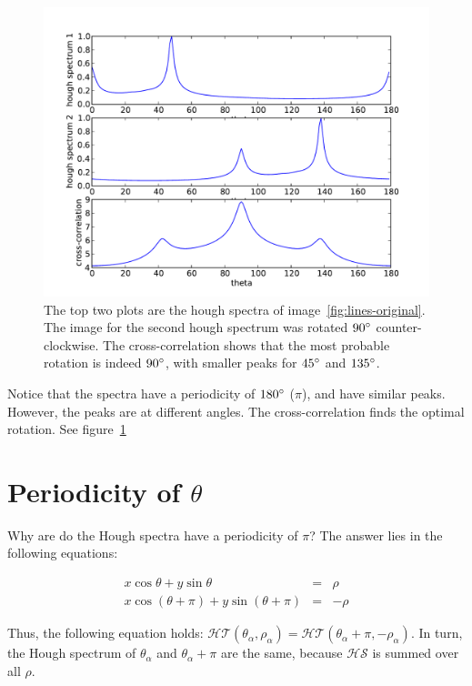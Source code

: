 \begin{figure}[ht]
	\centering
	\includegraphics[width=\textwidth]{images/stitching/lines-cross-correlation.pdf}
	\caption{The top two plots are the hough spectra of image~\ref{fig:lines-original}. The image for the second hough spectrum was rotated $90\degree$ counter-clockwise. The cross-correlation shows that the most probable rotation is indeed $90\degree$, with smaller peaks for $45\degree$ and $135\degree$.}
	\label{fig:lines-cross-correlation}
\end{figure}

Notice that the spectra have a periodicity of $180\degree$ ($\pi$), and have similar peaks. However, the peaks are at different angles. The cross-correlation finds the optimal rotation. See figure~\ref{fig:lines-cross-correlation}

\section{Periodicity of $\theta$}
\label{sub:periodicity}
Why are do the Hough spectra have a periodicity of $\pi$? The answer lies in the following equations:

\begin{eqnarray}
x\cos \theta + y\sin \theta &=& \rho \\
x\cos(\theta + \pi) + y\sin (\theta + \pi) &=& -\rho
\end{eqnarray}

Thus, the following equation holds: $\mathcal{HT}(\theta_\alpha, \rho_\alpha) = \mathcal{HT}(\theta_\alpha + \pi, -\rho_\alpha)$. In turn, the Hough spectrum of $\theta_\alpha$ and $\theta_\alpha + \pi$ are the same, because $\mathcal{HS}$ is summed over all $\rho$. 

